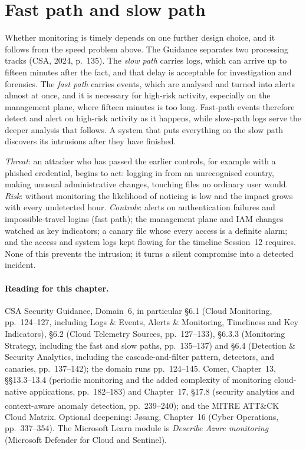 \section{Fast path and slow path}

Whether monitoring is timely depends on one further design choice, and it
follows from the speed problem above. The Guidance separates two processing
tracks (CSA, 2024, p.~135). The \emph{slow path} carries logs, which can
arrive up to fifteen minutes after the fact, and that delay is acceptable
for investigation and forensics. The \emph{fast path} carries events, which
are analysed and turned into alerts almost at once, and it is necessary for
high-risk activity, especially on the management plane, where fifteen
minutes is too long. Fast-path events therefore detect and alert on
high-risk activity as it happens, while slow-path logs serve the deeper
analysis that follows. A system that puts everything on the slow path
discovers its intrusions after they have finished.

\begin{example}\label{ex:monitor-trc}
\emph{Threat}: an attacker who has passed the earlier controls, for example
with a phished credential, begins to act: logging in from an unrecognised
country, making unusual administrative changes, touching files no ordinary
user would. \emph{Risk}: without monitoring the likelihood of noticing is low
and the impact grows with every undetected hour. \emph{Controls}: alerts on authentication failures and impossible-travel
logins (fast path); the management plane and IAM changes watched as key
indicators; a canary file whose every access is a definite alarm; and the
access and system logs kept flowing for the timeline Session~12 requires. None of this
prevents the intrusion; it turns a silent compromise into a detected
incident.
\end{example}

\paragraph{Reading for this chapter.} CSA Security Guidance, Domain~6, in
particular \S6.1 (Cloud Monitoring, pp.~124--127, including Logs \& Events,
Alerts \& Monitoring, Timeliness and Key Indicators), \S6.2 (Cloud Telemetry
Sources, pp.~127--133), \S6.3.3 (Monitoring Strategy, including the fast and
slow paths, pp.~135--137) and \S6.4 (Detection \& Security Analytics,
including the cascade-and-filter pattern, detectors, and canaries,
pp.~137--142); the domain runs pp.~124--145. Comer, Chapter~13,
\S\S13.3--13.4 (periodic monitoring and the added complexity of monitoring
cloud-native applications, pp.~182--183) and Chapter~17, \S17.8 (security
analytics and context-aware anomaly detection, pp.~239--240); and the MITRE
ATT\&CK\textsuperscript{\textregistered} Cloud Matrix. Optional deepening:
J\o sang, Chapter~16 (Cyber Operations, pp.~337--354). The Microsoft Learn module is
\emph{Describe Azure monitoring} (Microsoft Defender for Cloud and Sentinel).

